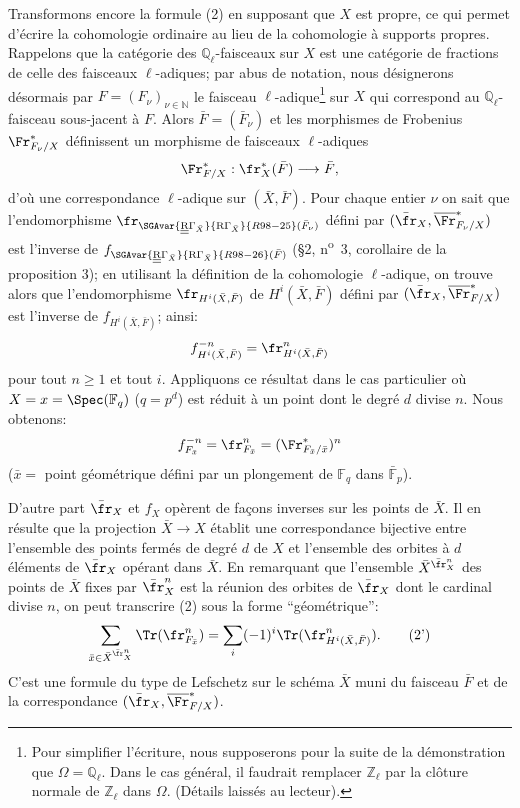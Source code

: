 Transformons encore la formule (2) en supposant que $X$ est propre, ce qui permet d'écrire la cohomologie ordinaire au lieu de la cohomologie à supports propres. Rappelons que la catégorie des $\mathbb{Q}_\ell$-faisceaux sur $X$ est une catégorie de fractions de celle des faisceaux $\ell$-adiques; par abus de notation, nous désignerons désormais par $F=(F_\nu)_{\nu\in\mathbb{N}}$ le faisceau $\ell$-adique\footnote{Pour simplifier l'écriture, nous supposerons pour la suite de la démonstration que $\Omega=\mathbb{Q}_\ell$. Dans le cas général, il faudrait remplacer $\mathbb{Z}_\ell$ par la clôture normale de $\mathbb{Z}_\ell$ dans $\Omega$. (Détails laissés au lecteur).} sur $X$ qui correspond au $\mathbb{Q}_\ell$-faisceau sous-jacent à $F$. Alors $\bar F=(\bar F_\nu)$ et les morphismes de Frobenius $\Fr^*_{F_\nu/X}$ définissent un morphisme de faisceaux $\ell$-adiques
\[
\Fr^*_{F/X}:\fr_X^*(\bar F)\longrightarrow\bar F,
\]
d'où une correspondance $\ell$-adique sur $(\bar X,\bar F)$. Pour chaque entier $\nu$ on sait que l'endomorphisme $\fr_{\SGAvar{\underline{\underline{\mathrm{R}}}\Gamma_{\bar X}}{\mathrm{R}\Gamma_{\bar X}}{R98-25}(\bar F_\nu)}$ défini par $(\bar{\fr}_X,\overline{\Fr}^*_{F_\nu/X})$ est l'inverse de $f_{\SGAvar{\underline{\underline{\mathrm{R}}}\Gamma_{\bar X}}{\mathrm{R}\Gamma_{\bar X}}{R98-26}(\bar F)}$ (§2, n\textsuperscript{o}~3, corollaire de la proposition 3); en utilisant la définition de la cohomologie $\ell$-adique, on trouve alors que l'endomorphisme $\fr_{H^i(\bar X,\bar F)}$ de $H^i(\bar X,\bar F)$ défini par $(\bar{\fr}_X,\overline{\Fr}^*_{F/X})$ est l'inverse de $f_{H^i(\bar X,\bar F)}$; ainsi:
\[
f^{-n}_{H^i(\bar X,\bar F)}=\fr^n_{H^i(\bar X,\bar F)}
\]
pour tout $n\ge1$ et tout $i$.
Appliquons ce résultat dans le cas particulier où $X=x=\Spec(\mathbb{F}_q)$ ($q=p^d$) est réduit à un point dont le degré $d$ divise $n$. Nous obtenons:
\[
f^{-n}_{F_{\bar x}}=\fr^n_{F_{\bar x}}=(\Fr^*_{F_{\bar x}/\bar x})^n
\]
($\bar x=$ point
géométrique défini par un plongement de $\mathbb{F}_q$ dans $\bar{\mathbb{F}}_p$).

D'autre part $\bar{\fr}_X$ et $f_X$ opèrent de façons inverses sur les points de $\bar X$. Il en résulte que la projection $\bar X\to X$ établit une correspondance bijective entre l'ensemble des points fermés de degré $d$ de $X$ et l'ensemble des orbites à $d$ éléments de $\bar{\fr}_X$ opérant dans $\bar X$. En remarquant que l'ensemble $\bar X^{\bar{\fr}_X^n}$ des points de $\bar X$ fixes par $\bar{\fr}_X^n$ est la réunion des orbites de $\bar{\fr}_X$ dont le cardinal divise $n$, on peut transcrire (2) sous la forme ``géométrique'':
\[
\sum_{\bar x\in\bar X^{\bar{\fr}_X^n}}\Tr(\fr^n_{F_{\bar x}})
=\sum_i(-1)^i\Tr(\fr^n_{H^i(\bar X,\bar F)}).
\tag{2'}
\]
C'est une formule du type de Lefschetz sur le schéma $\bar X$ muni du faisceau $\bar F$ et de la correspondance $(\bar{\fr}_X,\overline{\Fr}^*_{F/X})$.

